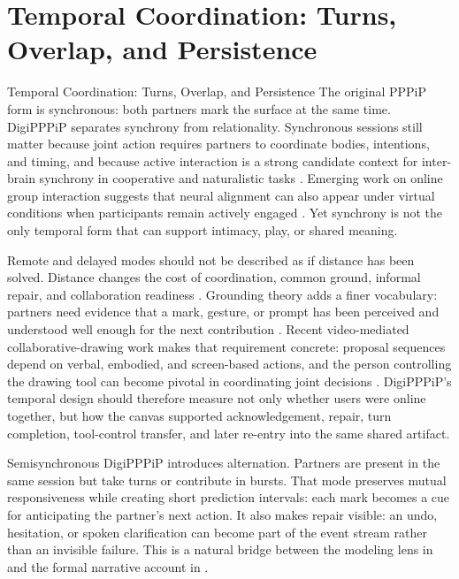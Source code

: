 \documentclass[
  ignorenonframetext,
]{beamer}
\author{\texorpdfstring{}{}}
\date{}
\begin{document}
\section{Temporal Coordination: Turns, Overlap, and
Persistence}\label{sec:temporal}

\begin{frame}{Temporal Coordination: Turns,
Overlap, and Persistence}
The original PPPiP form is synchronous: both partners mark the surface
at the same time. DigiPPPiP separates synchrony from relationality.
Synchronous sessions still matter because joint action requires partners
to coordinate bodies, intentions, and timing, and because active
interaction is a strong candidate context for inter-brain synchrony in
cooperative and naturalistic tasks . Emerging
work on online group interaction suggests that neural alignment can also
appear under virtual conditions when participants remain actively
engaged . Yet synchrony is not the only temporal
form that can support intimacy, play, or shared meaning.

Remote and delayed modes should not be described as if distance has been
solved. Distance changes the cost of coordination, common ground,
informal repair, and collaboration readiness .
Grounding theory adds a finer vocabulary: partners need evidence that a
mark, gesture, or prompt has been perceived and understood well enough
for the next contribution . Recent
video-mediated collaborative-drawing work makes that requirement
concrete: proposal sequences depend on verbal, embodied, and
screen-based actions, and the person controlling the drawing tool can
become pivotal in coordinating joint decisions
. DigiPPPiP's temporal design should
therefore measure not only whether users were online together, but how
the canvas supported acknowledgement, repair, turn completion,
tool-control transfer, and later re-entry into the same shared artifact.

Semisynchronous DigiPPPiP introduces alternation. Partners are present
in the same session but take turns or contribute in bursts. That mode
preserves mutual responsiveness while creating short prediction
intervals: each mark becomes a cue for anticipating the partner's next
action. It also makes repair visible: an undo, hesitation, or spoken
clarification can become part of the event stream rather than an
invisible failure. This is a natural bridge between the modeling lens in
 and the formal narrative account in
.


\end{frame}
\end{document}

